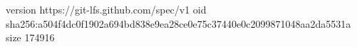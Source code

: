 version https://git-lfs.github.com/spec/v1
oid sha256:a504f4dc0f1902a694bd838e9ea28ce0e75c37440e0c2099871048aa2da5531a
size 174916
